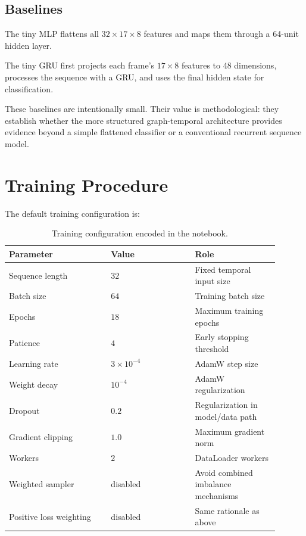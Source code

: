 \documentclass[11pt,a4paper]{article}
\begin{document}
\subsection{Baselines}

The tiny MLP flattens all $32\times17\times8$ features and maps them through a 64-unit hidden layer.

The tiny GRU first projects each frame's $17\times8$ features to 48 dimensions, processes the sequence with a GRU, and uses the final hidden state for classification.

These baselines are intentionally small. Their value is methodological: they establish whether the more structured graph-temporal architecture provides evidence beyond a simple flattened classifier or a conventional recurrent sequence model.

\section{Training Procedure}

The default training configuration is:

\begin{table}[ht]
\centering
\small
\begin{tabular}{p{0.34\linewidth}p{0.28\linewidth}p{0.28\linewidth}}
\toprule
\textbf{Parameter} & \textbf{Value} & \textbf{Role} \\
\midrule
Sequence length & $32$ & Fixed temporal input size \\
Batch size & $64$ & Training batch size \\
Epochs & $18$ & Maximum training epochs \\
Patience & $4$ & Early stopping threshold \\
Learning rate & $3\times10^{-4}$ & AdamW step size \\
Weight decay & $10^{-4}$ & AdamW regularization \\
Dropout & $0.2$ & Regularization in model/data path \\
Gradient clipping & $1.0$ & Maximum gradient norm \\
Workers & $2$ & DataLoader workers \\
Weighted sampler & disabled & Avoid combined imbalance mechanisms \\
Positive loss weighting & disabled & Same rationale as above \\
\bottomrule
\end{tabular}
\caption{Training configuration encoded in the notebook.}
\end{table}
\end{document}
